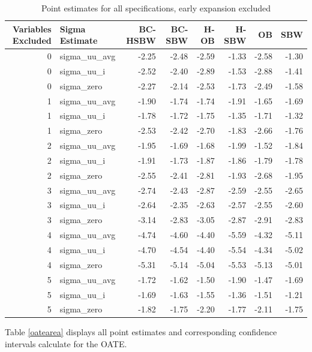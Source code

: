 \documentclass[12pt]{article}
\begin{document}
\begin{table}[ht]
\centering
\begin{tabular}{rlrrrrrr}
  \hline
Variables Excluded & Sigma Estimate & BC-HSBW & BC-SBW & H-OB & H-SBW & OB & SBW \\ 
  \hline
0 & sigma\_uu\_avg & -2.25 & -2.48 & -2.59 & -1.33 & -2.58 & -1.30 \\ 
  0 & sigma\_uu\_i & -2.52 & -2.40 & -2.89 & -1.53 & -2.88 & -1.41 \\ 
  0 & sigma\_zero & -2.27 & -2.14 & -2.53 & -1.73 & -2.49 & -1.58 \\ 
  1 & sigma\_uu\_avg & -1.90 & -1.74 & -1.74 & -1.91 & -1.65 & -1.69 \\ 
  1 & sigma\_uu\_i & -1.78 & -1.72 & -1.75 & -1.35 & -1.71 & -1.32 \\ 
  1 & sigma\_zero & -2.53 & -2.42 & -2.70 & -1.83 & -2.66 & -1.76 \\ 
  2 & sigma\_uu\_avg & -1.95 & -1.69 & -1.68 & -1.99 & -1.52 & -1.84 \\ 
  2 & sigma\_uu\_i & -1.91 & -1.73 & -1.87 & -1.86 & -1.79 & -1.78 \\ 
  2 & sigma\_zero & -2.55 & -2.41 & -2.81 & -1.93 & -2.68 & -1.95 \\ 
  3 & sigma\_uu\_avg & -2.74 & -2.43 & -2.87 & -2.59 & -2.55 & -2.65 \\ 
  3 & sigma\_uu\_i & -2.64 & -2.35 & -2.63 & -2.57 & -2.55 & -2.60 \\ 
  3 & sigma\_zero & -3.14 & -2.83 & -3.05 & -2.87 & -2.91 & -2.83 \\ 
  4 & sigma\_uu\_avg & -4.74 & -4.60 & -4.40 & -5.59 & -4.32 & -5.11 \\ 
  4 & sigma\_uu\_i & -4.70 & -4.54 & -4.40 & -5.54 & -4.34 & -5.02 \\ 
  4 & sigma\_zero & -5.31 & -5.14 & -5.04 & -5.53 & -5.13 & -5.01 \\ 
  5 & sigma\_uu\_avg & -1.72 & -1.62 & -1.50 & -1.90 & -1.47 & -1.69 \\ 
  5 & sigma\_uu\_i & -1.69 & -1.63 & -1.55 & -1.36 & -1.51 & -1.21 \\ 
  5 & sigma\_zero & -1.82 & -1.75 & -2.20 & -1.77 & -2.11 & -1.75 \\ 
   \hline
\end{tabular}
   \caption{Point estimates for all specifications, early expansion excluded}
   \label{pointesttablec2}
\end{table}

Table \ref{oatearea} displays all point estimates and corresponding confidence intervals calculate for the OATE.
\end{document}
